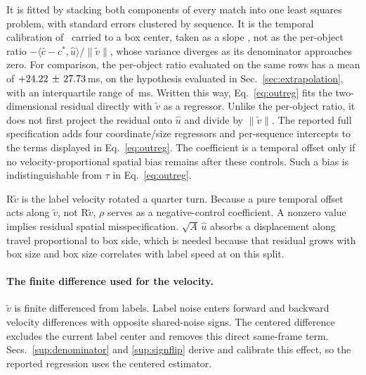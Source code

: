 \documentclass[10pt,twocolumn,letterpaper]{article}
\begin{document}
\noindent It is fitted by stacking both components of every match into one least
squares problem, with standard errors clustered by sequence. It is the temporal
calibration of~\cite{qin2018temporal} carried to a box center, taken as a slope
, not as the per-object ratio $-\langle
\hat{c}-c^{*},\hat{u}\rangle/\lVert \tilde v\rVert$, whose variance diverges as its
denominator approaches zero. For comparison, the per-object ratio evaluated on
the same rows has a mean of
$+24.22\,\pm\,27.73$\,ms, on the hypothesis evaluated in
Sec.~\ref{sec:extrapolation}, with an interquartile range of \ratioIQR\,ms.
Written this way, Eq.~\ref{eq:outreg} fits the two-dimensional residual directly with $\tilde v$ as a
regressor. Unlike the per-object ratio, it does not first project the residual onto $\hat u$
and divide by $\|\tilde v\|$.
The reported full specification adds four coordinate/size regressors and
per-sequence intercepts to the terms displayed in Eq.~\ref{eq:outreg}.
The coefficient is a temporal offset only if no velocity-proportional spatial
bias remains after these controls. Such a bias is indistinguishable from $\tau$ in Eq.~\ref{eq:outreg}.

$\mathrm{R}\tilde v$ is the label velocity rotated a quarter turn. Because a pure
temporal offset acts along $\tilde v$, not $\mathrm{R}\tilde v$, $\rho$ serves
as a negative-control coefficient. A nonzero value implies residual spatial
misspecification.
$\sqrt{A}\,\hat{u}$ absorbs a displacement along travel proportional to box side,
which is needed because that residual grows with box size and box size correlates
with label speed at \outSpeedSizeCorr{} on this split.

\paragraph{The finite difference used for the velocity.}
$\tilde v$ is finite differenced from labels. Label noise enters forward and backward
velocity differences with opposite shared-noise signs. The centered difference excludes the
current label center and removes this direct same-frame term. Secs.~\ref{sup:denominator} and \ref{sup:signflip} derive
and calibrate this effect, so the reported regression uses the centered estimator.
\end{document}
